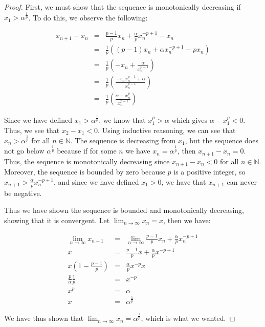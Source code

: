 \documentclass[psamsfonts]{amsart}
\theoremstyle{definition}
\theoremstyle{remark}
\numberwithin{equation}{section}
\begin{document}
\begin{proof}
First, we must show that the sequence is monotonically decreasing if $x_1 > \alpha^{\frac{1}{p}}$. To do this, we observe the following:

\begin{eqnarray}
x_{n+1} - x_n &=& \frac{p-1}{p}x_n + \frac{\alpha}{p} x_n^{-p +1} - x_n \\
&=& \frac{1}{p} \left( (p-1)x_n + \alpha x_n^{-p+1} - p x_n \right) \\
&=& \frac{1}{p} \left( - x_n + \frac{\alpha}{x_n^{p - 1}} \right) \\
&=& \frac{1}{p} \left( \frac{- x_n x_n^{p - 1} + \alpha}{x_n^{p-1}} \right) \\
&=& \frac{1}{p} \left( \frac{ \alpha - x_n^p}{x_n^{p-1}} \right)
\end{eqnarray}

Since we have defined $x_1 > \alpha^{\frac{1}{p}}$, we know that $x_1^{p} > \alpha$ which gives $\alpha - x_1^p < 0$. Thus, we see that $x_{2} - x_1 < 0$. Using inductive reasoning, we can see that $x_n > \alpha^{\frac{1}{p}}$ for all $n \in \mathbb{N}$. The sequence is decreasing from $x_1$, but the sequence does not go below $\alpha^{\frac{1}{p}}$ because if for some $n$ we have $x_n = \alpha^{\frac{1}{p}}$, then $x_{n+1} - x_n = 0$. Thus, the sequence is monotonically decreasing since $x_{n+1} - x_n < 0$ for all $n \in \mathbb{N}$. Moreover, the sequence is bounded by zero because $p$ is a positive integer, so $x_{n+1} > \frac{\alpha}{p} x_n^{-p+1}$, and since we have defined $x_1 > 0$, we have that $x_{n+1}$ can never be negative. 

Thus we have shown the sequence is bounded and monotonically decreasing, showing that it is convergent. Let $\lim_{n \to \infty} x_n = x$, then we have:

\begin{eqnarray}
\lim_{n \to \infty} x_{n+1} &=& \lim_{n \to \infty} \frac{p-1}{p} x_n + \frac{\alpha}{p} x_n^{-p + 1} \\
x &=& \frac{p-1}{p} x + \frac{\alpha}{p} x^{-p + 1} \\
x \left( 1 - \frac{p-1}{p} \right) &=& \frac{\alpha}{p} x^{-p} x \\
\frac{p}{\alpha} \frac{1}{p} &=& x^{-p} \\
x^p &=& \alpha \\
x &=& \alpha^{\frac{1}{p}}
\end{eqnarray} 

We have thus shown that $\lim_{n \to \infty} x_n = \alpha^{\frac{1}{p}}$, which is what we wanted.
\end{proof}
\end{document}
